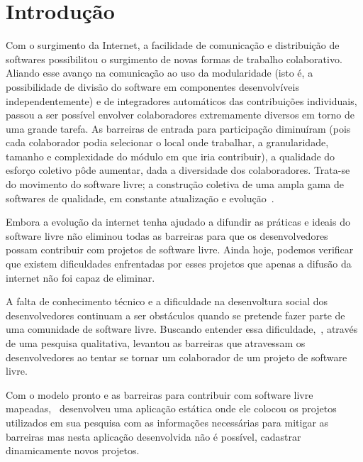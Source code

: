 \chapter{Introdução}

Com o surgimento da Internet, a facilidade de comunicação e distribuição de 
softwares possibilitou o surgimento de novas formas de trabalho colaborativo.
Aliando esse avanço na comunicação ao uso da modularidade (isto é, a possibilidade 
de divisão do software em componentes desenvolvíveis independentemente) e de 
integradores automáticos das contribuições individuais, passou a ser possível 
envolver colaboradores extremamente diversos em torno de uma grande tarefa. 
As barreiras de entrada para participação diminuíram (pois cada colaborador podia 
selecionar o local onde trabalhar, a granularidade, tamanho e complexidade do módulo 
em que iria contribuir), a qualidade do esforço coletivo pôde aumentar, dada a 
diversidade dos colaboradores. Trata-se do movimento do software livre; 
a construção coletiva de uma ampla gama de softwares de qualidade, em constante 
atualização e evolução~\cite{simon2010rossio}.

Embora a evolução da internet tenha ajudado a difundir as práticas e ideais do
software livre não eliminou todas as barreiras para que os desenvolvedores possam
contribuir com projetos de software livre. Ainda hoje, podemos verificar que 
existem dificuldades enfrentadas por esses projetos que apenas a difusão da internet 
não foi capaz de eliminar.

A falta de conhecimento técnico e a dificuldade na desenvoltura social dos desenvolvedores
continuam a ser obstáculos quando se pretende fazer parte de uma comunidade de software
livre. Buscando entender essa dificuldade,~, 
através de uma pesquisa qualitativa, levantou as barreiras que atravessam os desenvolvedores 
ao tentar se tornar um colaborador de um projeto de software livre.

Com o modelo pronto e as barreiras para contribuir com software livre mapeadas,~
desenvolveu uma aplicação estática onde ele colocou os projetos 
utilizados em sua pesquisa com as informações necessárias para mitigar as barreiras
mas nesta aplicação desenvolvida não é possível, cadastrar dinamicamente novos projetos.


